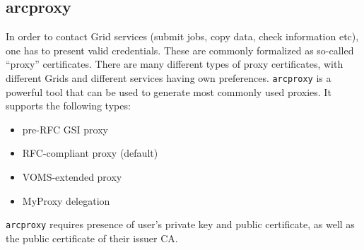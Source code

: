 \subsection{arcproxy}
\label{sec:arcproxy}

In order to contact Grid services
(submit jobs, copy data, check information etc),
one has to present valid credentials. These are commonly formalized as so-called
``proxy'' certificates. There are many different types of proxy certificates,
with different Grids and different services having own preferences. \texttt{arcproxy}
is a powerful tool that can be used to generate most commonly used proxies. It supports
the following types:
\begin{itemize}
  \item pre-RFC GSI proxy
  \item RFC-compliant proxy (default)
  \item VOMS-extended proxy
  \item MyProxy delegation
\end{itemize}

\texttt{arcproxy} requires presence of user's private key and public certificate,
as well as the public certificate of their issuer CA.

